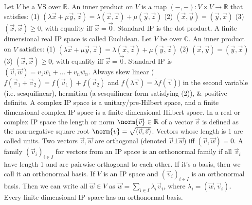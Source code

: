  Let $V$ be a VS over $\mathbb{R}$. An inner product on $V$ is a map $({-}, {-}) : V \times V \rightarrow \mathbb{R}$ that satisfies:
(1) $(\lambda \vec{x} + \mu \vec{y}, \vec{z}) = \lambda(\vec{x}, \vec{z}) + \mu(\vec{y}, \vec{z})$
(2) $(\vec{x}, \vec{y}) = (\vec{y}, \vec{x})$
(3) $(\vec{x}, \vec{x}) \ge 0$, with equality iff $\vec{x} = \vec{0}$.
Standard IP is the dot product.
A finite dimensional real IP space is called Euclidean.
 Let $V$ be over $\mathbb{C}$. An inner product on $V$ satisfies:
(1) $(\lambda \vec{x} + \mu \vec{y}, \vec{z}) = \lambda(\vec{x}, \vec{z}) + \mu(\vec{y}, \vec{z})$
(2) $(\vec{x}, \vec{y}) = \overline{(\vec{y}, \vec{x})}$
(3) $(\vec{x}, \vec{x}) \ge 0$, with equality iff $\vec{x} = \vec{0}$.
Standard IP is $(\vec{v}, \vec{w}) = v_1\bar{w_1} + \dots + v_n\bar{w_n}$.
Always skew linear ($f(\vec{v}_1 + \vec{v}_2) = f(\vec{v}_1) + f(\vec{v}_2)$ and $f(\lambda \vec{v}) = \bar{\lambda}f(\vec{v})$) in the second variable (i.e. sesquilinear),
hermitian (a sesquilinear form satisfying (2)), \& positive definite.
A complex IP space is a unitary/pre-Hilbert space, and a finite dimensional complex IP space is a finite dimensional Hilbert space.
 In a real or complex IP space the length or norm $\norm{\vec{v}} \in \mathbb{R}$ of a vector $\vec{v}$ is defined as the non-negative square root $\norm{v} = \sqrt{(\vec{v}, \vec{v})}$. Vectors whose length is 1 are called units. Two vectors $\vec{v}, \vec{w}$ are orthogonal (denoted $\vec{v} \bot \vec{w}$) iff $(\vec{v}, \vec{w}) = 0$.
 A family $(\vec{v}_i)_{i \in I}$ for vectors from an IP space is an orthonormal family if all $\vec{v}_i$ have length 1 and are pairwise orthogonal to each other. If it's a basis, then we call it an orthonormal basis.
 If $V$ is an IP space and $(\vec{v}_i)_{i \in I}$ is an orthonormal basis. Then we can write all $\vec{w} \in V$ as $\vec{w} = \sum_{i \in I} \lambda_i \vec{v}_i$, where $\lambda_i = (\vec{w}, \vec{v}_i)$.
 Every finite dimensional IP space has an orthonormal basis.
